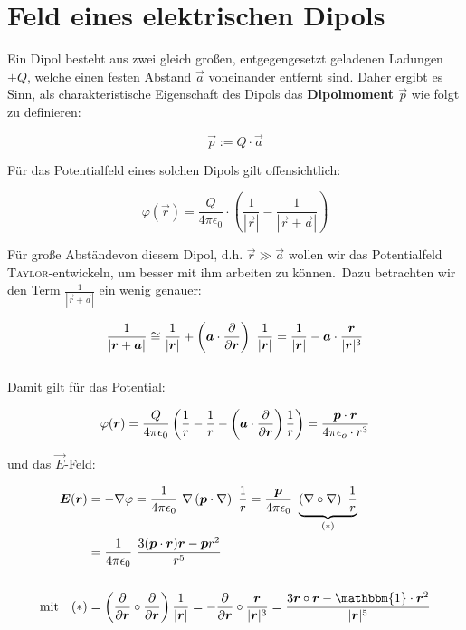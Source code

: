 \section{Feld eines elektrischen Dipols}

Ein Dipol besteht aus zwei gleich großen, entgegengesetzt geladenen Ladungen $\pm Q $, welche  einen festen Abstand $\vec{a}$ voneinander entfernt sind. Daher ergibt es Sinn, als charakteristische Eigenschaft des Dipols das \textbf{Dipolmoment $\vec{p}$} wie folgt zu definieren:

\begin{equation*}
\vec{p} := Q \cdot \vec{a}
\end{equation*}

Für das Potentialfeld eines solchen Dipols gilt offensichtlich:

\begin{equation*}
\varphi(\vec{r}) = \frac{Q}{4\pi\epsilon_0}\cdot\left(\frac{1}{|\vec{r}|} - \frac{1}{|\vec{r}+\vec{a}|}\right)
\end{equation*}

Für große Abständevon diesem Dipol, d.h. $\vec{r}\gg\vec{a}$ wollen wir das Potentialfeld \textsc{Taylor}-entwickeln, um besser mit ihm arbeiten zu können.\
Dazu betrachten wir den Term $\frac{1}{|\vec{r}+\vec{a}|}$ ein wenig genauer:

\begin{equation*}
\frac{1}{|\vec{r}+\vec{a}|} \cong \frac{1}{|\vec{r}|} + \left(\vec{a}\cdot\pdiff{}{\vec{r}}\right) \ \frac{1}{|\vec{r}|} = \frac{1}{|\vec{r}|}-\vec{a}\cdot\frac{\vec{r}}{|\vec{r}|^3}
\end{equation*}
\ \\
Damit gilt für das Potential:

\begin{equation*}
\varphi(\bm{r})=\frac{Q}{4\pi\epsilon_0}\left(\frac{1}{r}-\frac{1}{r}-\left(\bm{a}\cdot\frac{\partial{}}{\partial{\bm{r}}}\right)\frac{1}{r}\right) = \frac{\bm{p}\cdot\bm{r}}{4\pi\epsilon_o\cdot r^3}
\end{equation*}

und das $\vec{E}$-Feld:

\begin{align*}
\vec{E}(\vec{r}) &= - \nabla \varphi = \frac{1}{4\pi\epsilon_0}\ \nabla \left(\vec{p}\cdot\nabla\right)\ \frac{1}{r} = \frac{\vec{p}}{4\pi\epsilon_0}\ \underbrace{\left(\nabla \circ \nabla\right)\ \frac{1}{r}}_{(*)}\\
&= \frac{1}{4\pi\epsilon_0}\ \frac{3(\vec{p}\cdot\vec{r})\vec{r} - \vec{p}r^2}{r^5}\\
\ \\
\text{mit}\quad (*) &= \left(\pdiff{}{\vec{r}} \circ \pdiff{}{\vec{r}}\right)\frac{1}{|\vec{r}|} = - \pdiff{}{\vec{r}}\circ\frac{\vec{r}}{|\vec{r}|^3} = \frac{3\vec{r}\circ\vec{r}-\mathbbm{1}\cdot\vec{r}^2}{|\vec{r}|^5}
\end{align*}